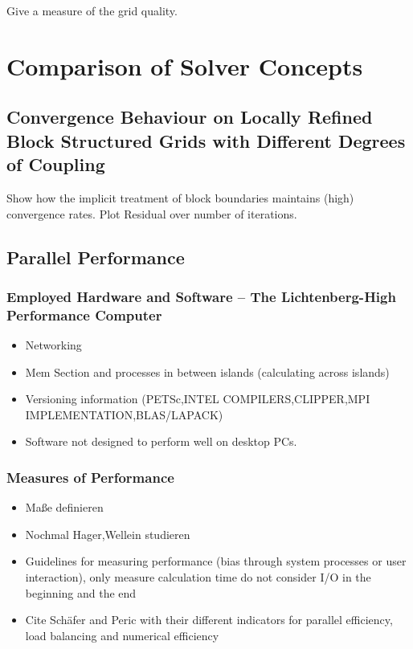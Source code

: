 \documentclass[article,type=msc,colorback,accentcolor=tud2a]{tudthesis}
\begin{document}
        Give a measure of the grid quality.

  \section{Comparison of Solver Concepts}
  
    \subsection{Convergence Behaviour on Locally Refined Block Structured Grids with Different Degrees of Coupling}

      Show how the implicit treatment of block boundaries maintains (high) convergence rates. Plot Residual over number of iterations.

    \subsection{Parallel Performance}
      \subsubsection{Employed Hardware and Software -- The Lichtenberg-High Performance Computer }
        \begin{itemize}
          \item Networking
          \item Mem Section and processes in between islands (calculating across islands)
          \item Versioning information (PETSc,INTEL COMPILERS,CLIPPER,MPI IMPLEMENTATION,BLAS/LAPACK)
          \item Software not designed to perform well on desktop PCs.
        \end{itemize}

      \subsubsection{Measures of Performance}
        \begin{itemize}
          \item Maße definieren
          \item Nochmal Hager,Wellein studieren
          \item Guidelines for measuring performance (bias through system processes or user interaction), only measure calculation time do not consider I/O in the beginning and the end
          \item Cite Schäfer and Peric with their different indicators for parallel efficiency, load balancing and numerical efficiency
        \end{itemize}
\end{document}
